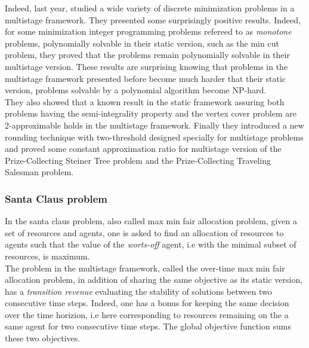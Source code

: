 \documentclass[a4paper]{book}
\begin{document}
Indeed, last year, \cite{bampis2019lp} studied a wide variety of discrete minimization problems in a multistage framework. They presented some surprisingly positive results. Indeed, for some minimization integer programming problems refereed to as \textit{monotone} problems, polynomially solvable in their static version, such as the {\sc min cut} problem, they proved that the problems remain polynomially solvable in their multistage version. These results are surprising knowing that problems in the multistage framework presented before become much harder that their static version, problems solvable by a polynomial algorithm become NP-hard. \\
They also showed that a known result in the static framework assuring both problems having the semi-integrality property and the {\sc vertex cover} problem are 2-approximable holds in the multistage framework. Finally they introduced a new rounding technique with two-threshold designed specially for multistage problems and proved some constant approximation ratio for multistage version of the {\sc Prize-Collecting Steiner Tree} problem and the {\sc Prize-Collecting Traveling Salesman} problem. 



\subsubsection{Santa Claus problem}
In the {\sc santa claus} problem, also called {\sc max min fair allocation} problem, given a set of resources and agents, one is asked to find an allocation of resources to agents such that the value of the \textit{worts-off} agent, i.e with the minimal subset of resources, is maximum. \\
The problem in the multistage framework, called the {\sc over-time max min fair allocation} problem, in addition of sharing the same objective as its static version, has a \textit{transition revenue} evaluating the stability of solutions between two consecutive time steps. Indeed, one has a bonus for keeping the same decision over the time horizion, i.e here corresponding to resources remaining on the a same agent for two consecutive time steps. The global objective function sums these two objectives.\\
\end{document}
